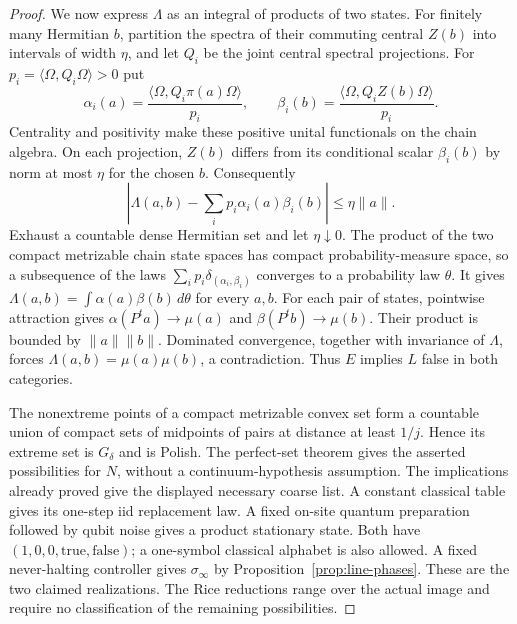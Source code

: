 \begin{proof}
We now express $\Lambda$ as an integral of products of two states.
For finitely many Hermitian $b$, partition the spectra of their
commuting central $Z(b)$ into intervals of width $\eta$, and let
$Q_i$ be the joint central spectral projections. For
$p_i=\langle\Omega,Q_i\Omega\rangle>0$ put
\[
 \alpha_i(a)=\frac{\langle\Omega,Q_i\pi(a)\Omega\rangle}{p_i},
 \qquad
 \beta_i(b)=\frac{\langle\Omega,Q_iZ(b)\Omega\rangle}{p_i}.
\]
Centrality and positivity make these positive unital functionals
on the chain algebra. On each projection, $Z(b)$ differs from its
conditional scalar $\beta_i(b)$ by norm at most $\eta$ for the
chosen $b$. Consequently
\[
 \left|\Lambda(a,b)-\sum_i p_i\alpha_i(a)\beta_i(b)\right|
 \le\eta\|a\|.
\]
Exhaust a countable dense Hermitian set and let $\eta\downarrow0$.
The product of the two compact metrizable chain state spaces has
compact probability-measure space, so a subsequence of the laws
$\sum_i p_i\delta_{(\alpha_i,\beta_i)}$ converges to a probability
law $\theta$. It gives
$\Lambda(a,b)=\int\alpha(a)\beta(b)\,d\theta$ for every $a,b$.
For each pair of states, pointwise attraction gives
$\alpha(P^ta)\to\mu(a)$ and $\beta(P^tb)\to\mu(b)$.
Their product is bounded by $\|a\|\|b\|$. Dominated convergence,
together with invariance of $\Lambda$, forces
$\Lambda(a,b)=\mu(a)\mu(b)$, a contradiction.
Thus $E$ implies $L$ false in both categories.

The nonextreme points of a compact metrizable convex set form a
countable union of compact sets of midpoints of pairs at distance
at least $1/j$. Hence its extreme set is $G_\delta$ and is Polish.
The perfect-set theorem gives the asserted possibilities for $N$,
without a continuum-hypothesis assumption. The implications already
proved give the displayed necessary coarse list.
A constant classical table gives its one-step iid replacement law.
A fixed on-site quantum preparation followed by qubit noise gives
a product stationary state. Both have
$(1,0,0,\mathrm{true},\mathrm{false})$; a one-symbol classical
alphabet is also allowed. A fixed never-halting controller gives
$\sigma_\infty$ by Proposition~\ref{prop:line-phases}.
These are the two claimed realizations. The Rice reductions range
over the actual image and require no classification of the remaining
possibilities.
\end{proof}

